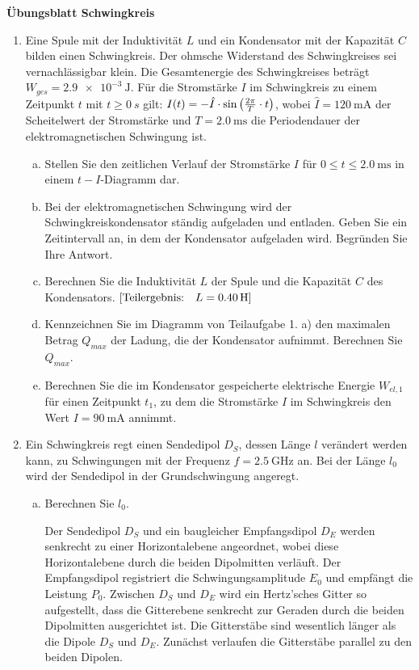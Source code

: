 \documentclass[a4paper]{article}
\begin{document}
{\bf Übungsblatt Schwingkreis }\\
\begin{enumerate}[1.]
\item Eine Spule mit der Induktivität $L$ und ein Kondensator mit der Kapazität $C$ bilden einen Schwingkreis. Der ohmsche Widerstand des Schwingkreises sei vernachlässigbar klein. Die Gesamtenergie des Schwingkreises beträgt $W_{ges}=\SI{2,9e-3}{\joule}$. Für die Stromstärke
$I$ im Schwingkreis zu einem Zeitpunkt $t$ mit $ t\ge 0~s$ gilt: 
$ I(t)= -\hat{I}\cdot \sin{ \left( {2 \pi \over T} \cdot t \right)}$, wobei $\hat{I}=\SI{120}{\milli\ampere}$ der Scheitelwert der Stromstärke und $T=\SI{2,0}{\milli\second}$ die Periodendauer der elektromagnetischen Schwingung ist.

\begin{enumerate}[a)]
\item Stellen Sie den zeitlichen Verlauf der Stromstärke $I$ für $0 \le t \le \SI{2,0}{\milli\second}$ in einem $t-I$-Diagramm dar.
\item Bei der elektromagnetischen Schwingung wird der Schwingkreiskondensator ständig aufgeladen und entladen. Geben Sie ein Zeitintervall an, in dem der Kondensator aufgeladen wird. Begründen Sie Ihre Antwort.
\item Berechnen Sie die Induktivität $L$ der Spule und die Kapazität $C$  des Kondensators. $[\textnormal{Teilergebnis:} \quad L=\SI{0,40}{\henry}]$
\item Kennzeichnen Sie im Diagramm von Teilaufgabe 1. a) den maximalen Betrag $Q_{max}$ der Ladung, die der Kondensator aufnimmt. Berechnen Sie  $Q_{max}$.
\item Berechnen Sie die im Kondensator gespeicherte elektrische Energie $W_{el,1}$ für einen Zeitpunkt $t_1$, zu dem die Stromstärke $I$ im Schwingkreis den Wert $I=\SI{90}{\milli\ampere}$ annimmt.
\end{enumerate}

\item Ein Schwingkreis regt einen Sendedipol $D_S$, dessen Länge $l$ verändert werden kann, zu Schwingungen mit der Frequenz $f=\SI{2,5}{\giga\hertz}$ an. Bei der Länge $l_0$ wird der Sendedipol in der Grundschwingung angeregt. 
\begin{enumerate}[a)]
\item Berechnen Sie $l_0$.

Der Sendedipol $D_S$ und ein baugleicher Empfangsdipol $D_E$ werden senk\-recht zu einer Horizontalebene angeordnet, wobei diese Horizontalebene durch die beiden Dipolmitten verläuft. Der Empfangsdipol registriert die Schwing\-ungsamplitude $E_0$ und empfängt die Leistung $P_0$. Zwischen $D_S$ und $D_E$ wird ein Hertz'sches Gitter so aufgestellt, dass die Gitterebene senkrecht zur Ge\-raden durch die beiden Dipolmitten ausgerichtet ist. Die Gitterstäbe sind wesentlich länger als die Dipole $D_S$ und $D_E$. Zunächst verlaufen die Gitterstäbe parallel zu den beiden Dipolen.


\end{enumerate}
\end{enumerate}
\end{document}
